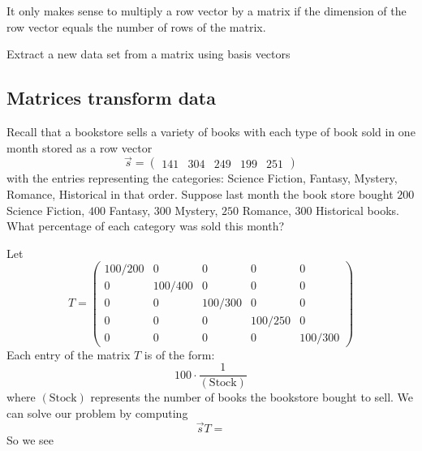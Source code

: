 \documentclass{ximera}
\begin{document}
\begin{warning}
  It only makes sense to multiply a row vector by a matrix if the
  dimension of the row vector equals the number of rows of the
  matrix.
\end{warning}

\begin{example}
Extract a new data set from a matrix using basis vectors
\end{example}


\begin{example}
\end{example}



\subsection{Matrices transform data}


\begin{example}
  Recall that a bookstore sells a variety of books with each type of
  book sold in one month stored as a row vector
  \[
  \vec{s} = \begin{pmatrix}141 & 304 & 249 & 199 & 251 \end{pmatrix}
  \]
  with the entries representing the categories: Science Fiction,
  Fantasy, Mystery, Romance, Historical in that order.  Suppose last
  month the book store bought $200$ Science Fiction, $400$ Fantasy, $300$
  Mystery, $250$ Romance, $300$ Historical books. What percentage of each
  category was sold this month?
  \begin{explanation}
    Let
    \[
    T =
    \begin{pmatrix}
      100/200 & 0 &    0   &   0    &   0 \\
      0 & 100/400 &    0   &   0    &   0 \\
      0 &   0   &  100/300 &   0    &   0 \\
      0 &   0   &    0   & 100/250  &   0 \\
      0 &   0   &    0   &   0    & 100/300
    \end{pmatrix}
    \]
    Each entry of the matrix $T$ is of the form:
    \[
    100 \cdot \frac{1}{(\text{Stock})}
    \]
    where $(\text{Stock})$ represents the number of books the
    bookstore bought to sell.  We can solve our problem by computing
    \[
    \vec{s} T =
    \]
    So we see
  \end{explanation}

\end{example}
\end{document}
